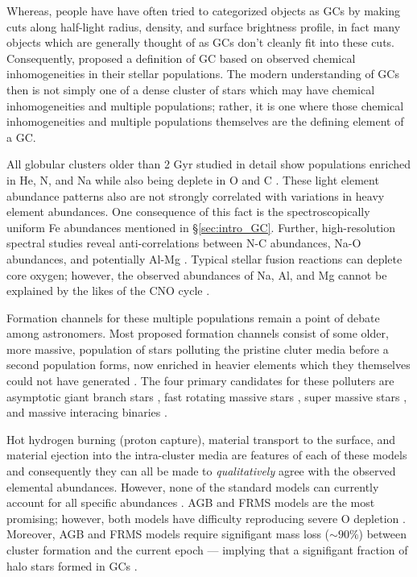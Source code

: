 Whereas, people have have often tried to categorized objects as GCs by making
cuts along half-light radius, density, and surface brightness profile, in fact
many objects which are generally thought of as GCs don't cleanly fit into these
cuts. Consequently, \citet{Carretta2010} proposed a definition of GC based on
observed chemical inhomogeneities in their stellar populations. The modern
understanding of GCs then is not simply one of a dense cluster of stars which
may have chemical inhomogeneities and multiple populations; rather, it is one
where those chemical inhomogeneities and multiple populations themselves are
the defining element of a GC.

All globular clusters older than 2 Gyr studied in detail show populations
enriched in He, N, and Na while also being deplete in O and C
\citep{Piotto2015,Bastian2018}. These light element abundance patterns also are
not strongly correlated with variations in heavy element abundances. One
consequence of this fact is the spectroscopically uniform Fe abundances
mentioned in \S\ref{sec:intro_GC}. Further, high-resolution spectral studies
reveal anti-correlations between N-C abundances, Na-O abundances, and
potentially Al-Mg \citep{Sneden1992, Gratton2012}. Typical stellar fusion
reactions can deplete core oxygen; however, the observed abundances of Na, Al,
and Mg cannot be explained by the likes of the CNO cycle \citep{Prantzos2007}.

Formation channels for these multiple populations remain a point of debate
among astronomers. Most proposed formation channels consist of some older,
more massive, population of stars polluting the pristine cluter media before a
second population forms, now enriched in heavier elements which they themselves could
not have generated \citep[for a detailed review see ][]{Gratton2012}. The four
primary candidates for these polluters are asymptotic giant branch stars
\citep[AGBs,][]{Ventura2001,DErcole2010}, fast rotating massive stars
\citep[FRMSs,][]{Decressin2007}, super massive stars
\citep[SMSs,][]{Denissenkov2014}, and massive interacing binaries
\citep[MIBs,][]{deMink2009, Bastian2018}. 

Hot hydrogen burning (proton capture), material transport to the surface, and
material ejection into the intra-cluster media are features of each of these
models and consequently they can all be made to {\it qualitatively} agree with
the observed elemental abundances. However, none of the standard models can
currently account for all specific abundances \citep{Gratton2012}. AGB and FRMS
models are the most promising; however, both models have difficulty reproducing
severe O depletion \citep{Ventura2009,Decressin2007}. Moreover, AGB and FRMS
models require signifigant mass loss ($\sim 90\%$) between cluster formation
and the current epoch --- implying that a signifigant fraction of halo stars
formed in GCs \citep{Renzini2008,DErcole2008,Bastian2015}.

